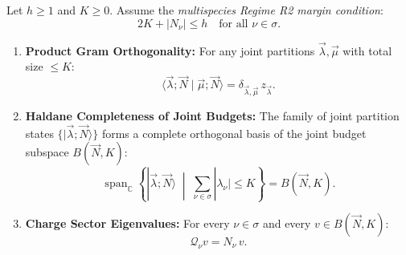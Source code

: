 \begin{theorem}
\label{thm:joint_haldane_basis}
Let $h \ge 1$ and $K \ge 0$. Assume the \emph{multispecies Regime R2 margin condition}:
\begin{equation}
\label{eq:multispecies_r2}
2K + |N_\nu| \le h \quad \text{for all } \nu \in \sigma.
\end{equation}
\begin{enumerate}
    \item \textbf{Product Gram Orthogonality:} For any joint partitions $\vec{\lambda}, \vec{\mu}$ with total size $\le K$:
    \begin{equation}
    \langle \vec{\lambda}; \vec{N} \mid \vec{\mu}; \vec{N} \rangle = \delta_{\vec{\lambda}, \vec{\mu}}\, z_{\vec{\lambda}}.
    \end{equation}
    \item \textbf{Haldane Completeness of Joint Budgets:} The family of joint partition states $\{|\vec{\lambda}; \vec{N}\rangle\}$ forms a complete orthogonal basis of the joint budget subspace $B(\vec{N}, K)$:
    \begin{equation}
    \operatorname{span}_{\mathbb{C}} \left\{ |\vec{\lambda}; \vec{N}\rangle \;\middle|\; \sum_{\nu \in \sigma} |\lambda_\nu| \le K \right\} = B(\vec{N}, K).
    \end{equation}
    \item \textbf{Charge Sector Eigenvalues:} For every $\nu \in \sigma$ and every $v \in B(\vec{N}, K)$:
    \begin{equation}
    \mathcal{Q}_\nu v = N_\nu\, v.
    \end{equation}
\end{enumerate}
\end{theorem}

